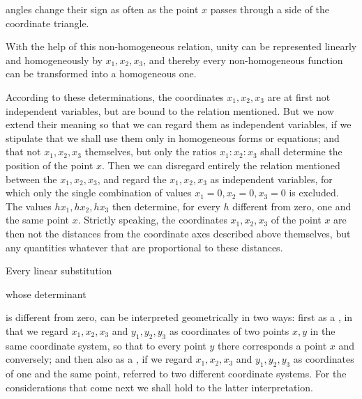 angles change their sign as often as the point $x$ passes through a side
of the coordinate triangle.

With the help of this non-homogeneous relation, unity can be
represented linearly and homogeneously by $x_1, x_2, x_3$, and thereby
every non-homogeneous function can be transformed into a homogeneous
one.

According to these determinations, the coordinates $x_1, x_2, x_3$
are at first not independent variables, but are bound to the relation
mentioned. But we now extend their meaning so that we can regard
them as independent variables, if we stipulate that we shall use them
only in homogeneous forms or equations;
and that not $x_1, x_2, x_3$ themselves,
but only the ratios $x_1 : x_2 : x_3$ shall determine the position of the point $x$.
Then we can disregard entirely the relation mentioned
between the $x_1, x_2, x_3$, and regard the $x_1, x_2, x_3$ as independent variables, for which only the single combination of values $x_1 = 0, x_2 = 0, x_3 = 0$ is excluded. The
values $h x_1, h x_2, h x_3$ then determine, for every $h$ different from zero, one and the same point $x$. Strictly speaking, the
coordinates $x_1, x_2, x_3$ of the point $x$ are then not the distances
from the coordinate axes described above themselves, but any quantities whatever that are proportional to these distances.

Every linear substitution


\noindent whose determinant


\noindent is different from zero, can be interpreted geometrically in two
ways: first as a , in that we regard $x_1, x_2, x_3$
and $y_1, y_2, y_3$ as coordinates of two points $x, y$ in the same
coordinate system, so that to every point $y$ there corresponds a point $x$
and conversely; and then also as a , if we regard $x_1, x_2, x_3$ and $y_1, y_2, y_3$ as coordinates of one and the same point, referred to two different
coordinate systems. For the considerations that come next
we shall hold to the latter interpretation.
